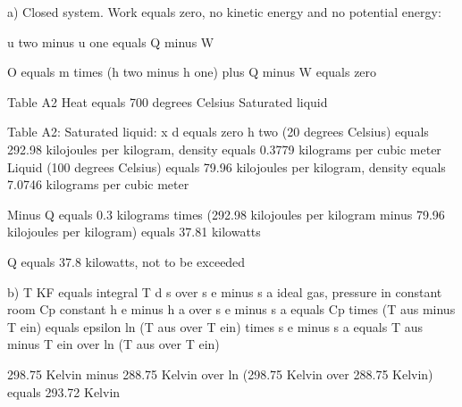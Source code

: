 a) Closed system. Work equals zero, no kinetic energy and no potential energy:

u two minus u one equals Q minus W

O equals m times (h two minus h one) plus Q minus W equals zero

Table A2
Heat equals 700 degrees Celsius
Saturated liquid

Table A2: Saturated liquid: x d equals zero
h two (20 degrees Celsius) equals 292.98 kilojoules per kilogram, density equals 0.3779 kilograms per cubic meter
Liquid (100 degrees Celsius) equals 79.96 kilojoules per kilogram, density equals 7.0746 kilograms per cubic meter

Minus Q equals 0.3 kilograms times (292.98 kilojoules per kilogram minus 79.96 kilojoules per kilogram) equals 37.81 kilowatts

Q equals 37.8 kilowatts, not to be exceeded

b) T KF equals integral T d s over s e minus s a
ideal gas, pressure in constant room
Cp constant
h e minus h a over s e minus s a equals Cp times (T aus minus T ein) equals epsilon ln (T aus over T ein) times s e minus s a equals T aus minus T ein over ln (T aus over T ein)

298.75 Kelvin minus 288.75 Kelvin over ln (298.75 Kelvin over 288.75 Kelvin) equals 293.72 Kelvin